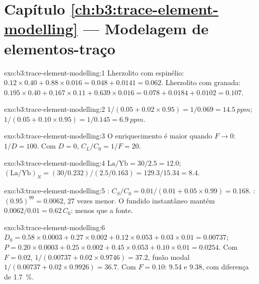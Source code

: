 \section*{Capítulo \ref{ch:b3:trace-element-modelling} --- Modelagem de elementos-traço}

\begin{solution}{exo:b3:trace-element-modelling:1}
Lherzolito com espinélio: $0.12\times0.40 + 0.88\times0.016 = 0.048 + 0.0141 =
0.062$. Lherzolito com granada: $0.195\times0.40 + 0.167\times0.11 +
0.639\times0.016 = 0.078 + 0.0184 + 0.0102 = 0.107$.
\end{solution}

\begin{solution}{exo:b3:trace-element-modelling:2}
$1/(0.05 + 0.02\times0.95) = 1/0.069 = \qty{14.5}{ppm}$;
$1/(0.05 + 0.10\times0.95) = 1/0.145 = \qty{6.9}{ppm}$.
\end{solution}

\begin{solution}{exo:b3:trace-element-modelling:3}
O enriquecimento é maior quando $F \to 0$: $1/D = 100$. Com $D = 0$,
$C_L/C_0 = 1/F = 20$.
\end{solution}

\begin{solution}{exo:b3:trace-element-modelling:4}
$\mathrm{La/Yb} = 30/2.5 = 12.0$; $(\mathrm{La}/\mathrm{Yb})_N =
(30/0.232)/(2.5/0.163) = 129.3/15.34 = 8.4$.
\end{solution}

\begin{solution}{exo:b3:trace-element-modelling:5}
: $C_S/C_0 = 0.01/(0.01 + 0.05\times0.99) = 0.168$. :
$(0.95)^{99} = 0.0062$, 27 vezes menor. O fundido instantâneo mantém
$0.0062/0.01 = 0.62\,C_0$: menos que a fonte.
\end{solution}

\begin{solution}{exo:b3:trace-element-modelling:6}
$D_0 = 0.58\times0.0003 + 0.27\times0.002 + 0.12\times0.053 + 0.03\times0.01
= 0.00737$; $P = 0.20\times0.0003 + 0.25\times0.002 + 0.45\times0.053 +
0.10\times0.01 = 0.0254$. Com $F = 0.02$,  $1/(0.00737 +
0.02\times0.9746) = 37.2$, fusão modal $1/(0.00737 + 0.02\times0.9926) = 36.7$. Com
$F = 0.10$: 9.54 e 9.38, com diferença de \qty{1.7}{\percent}.
\end{solution}

